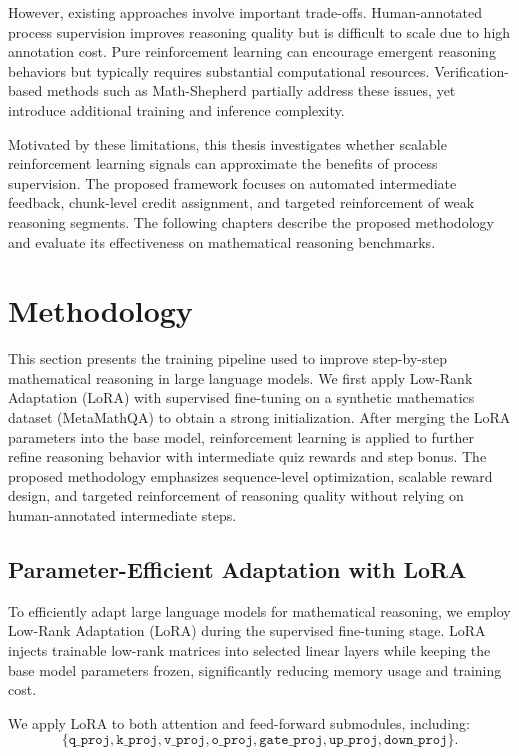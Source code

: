\documentclass[12pt]{report}
\begin{document}
However, existing approaches involve important trade-offs. Human-annotated process supervision improves reasoning quality but is difficult to scale due to high annotation cost. Pure reinforcement learning can encourage emergent reasoning behaviors but typically requires substantial computational resources. Verification-based methods such as Math-Shepherd partially address these issues, yet introduce additional training and inference complexity.

Motivated by these limitations, this thesis investigates whether scalable reinforcement learning signals can approximate the benefits of process supervision. The proposed framework focuses on automated intermediate feedback, chunk-level credit assignment, and targeted reinforcement of weak reasoning segments. The following chapters describe the proposed methodology and evaluate its effectiveness on mathematical reasoning benchmarks.


\chapter{Methodology}
This section presents the training pipeline used to improve step-by-step mathematical reasoning in large language models. We first apply Low-Rank Adaptation (LoRA) with supervised fine-tuning on a synthetic mathematics dataset (MetaMathQA) to obtain a strong initialization. After merging the LoRA parameters into the base model, reinforcement learning is applied to further refine reasoning behavior with intermediate quiz rewards and step bonus. The proposed methodology emphasizes sequence-level optimization, scalable reward design, and targeted reinforcement of reasoning quality without relying on human-annotated intermediate steps.

\section{Parameter-Efficient Adaptation with LoRA}
To efficiently adapt large language models for mathematical reasoning, we employ Low-Rank Adaptation (LoRA) during the supervised fine-tuning stage. LoRA injects trainable low-rank matrices into selected linear layers while keeping the base model parameters frozen, significantly reducing memory usage and training cost.

We apply LoRA to both attention and feed-forward submodules, including:
\[
\{ \texttt{q\_proj}, \texttt{k\_proj}, \texttt{v\_proj}, \texttt{o\_proj},
   \texttt{gate\_proj}, \texttt{up\_proj}, \texttt{down\_proj} \}.
\]
\end{document}

